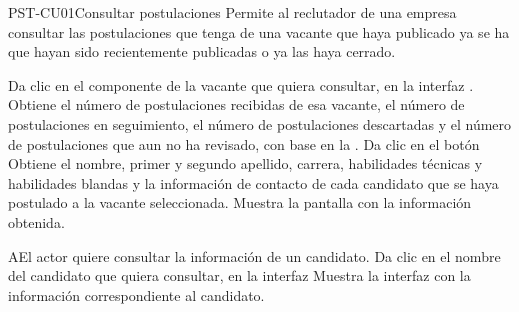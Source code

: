 \clearpage
\begin{UseCase}[]{PST-CU01}{Consultar postulaciones}{
	Permite al reclutador de una empresa  consultar las postulaciones que tenga de una vacante que haya publicado ya se ha que hayan sido recientemente publicadas 
	o ya las haya cerrado.
	}
\end{UseCase}

\begin{UCtrayectoria}
	\UCpaso [\UCactor] Da clic en el componente  de la vacante que quiera consultar, en la interfaz .
	\UCpaso [\UCsist] Obtiene el número de postulaciones recibidas de esa vacante, el número de postulaciones en seguimiento, el número de postulaciones
	descartadas y el número de postulaciones que aun no ha revisado, con base en la .
	\UCpaso [\UCactor] Da clic en el botón 
	\UCpaso [\UCsist] Obtiene el nombre, primer y segundo apellido, carrera, habilidades técnicas y habilidades blandas y la
	información de contacto de cada candidato que se haya postulado a la vacante seleccionada.
	\UCpaso [\UCsist] Muestra la pantalla  con la información obtenida.   \label{PST-CU01:1}

\end{UCtrayectoria}


\begin{UCtrayectoriaA}{A}{El actor quiere consultar la información de un candidato.}
	\UCpaso [\UCactor] Da clic en el nombre del candidato que quiera consultar, en la interfaz  
	\UCpaso [\UCsist] Muestra la interfaz  con la información correspondiente al candidato.
\end{UCtrayectoriaA} 

